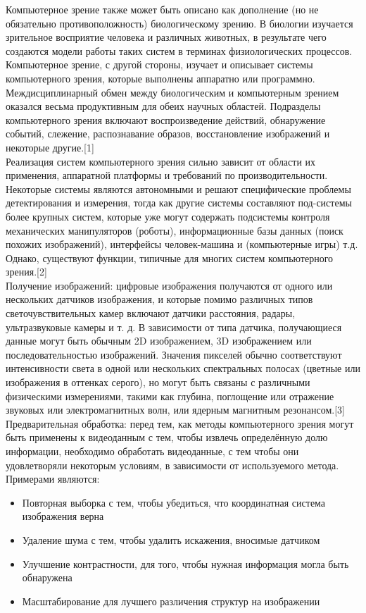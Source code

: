 \documentclass[12pt]{article}
\begin{document}
Компьютерное зрение также может быть описано как дополнение (но не обязательно противоположность) биологическому зрению. В биологии изучается зрительное восприятие человека и различных животных, в результате чего создаются модели работы таких систем в терминах физиологических процессов. Компьютерное зрение, с другой стороны, изучает и описывает системы компьютерного зрения, которые выполнены аппаратно или программно. Междисциплинарный обмен между биологическим и компьютерным зрением оказался весьма продуктивным для обеих научных областей.
Подразделы компьютерного зрения включают воспроизведение действий, обнаружение событий, слежение, распознавание образов, восстановление изображений и некоторые другие.[1]
\\  \indent Реализация систем компьютерного зрения сильно зависит от области их применения, аппаратной платформы и требований по производительности. Некоторые системы являются автономными и решают специфические проблемы детектирования и измерения, тогда как другие системы составляют под-системы более крупных систем, которые уже могут содержать подсистемы контроля механических манипуляторов (роботы), информационные базы данных (поиск похожих изображений), интерфейсы человек-машина и (компьютерные игры) т.д. Однако, существуют функции, типичные для многих систем компьютерного зрения.[2]
\\  \indent  Получение изображений: цифровые изображения получаются от одного или нескольких датчиков изображения, и которые помимо различных типов светочувствительных камер включают датчики расстояния, радары, ультразвуковые камеры и т. д. В зависимости от типа датчика, получающиеся данные могут быть обычным 2D изображением, 3D изображением или последовательностью изображений. Значения пикселей обычно соответствуют интенсивности света в одной или нескольких спектральных полосах (цветные или изображения в оттенках серого), но могут быть связаны с различными физическими измерениями, такими как глубина, поглощение или отражение звуковых или электромагнитных волн, или ядерным магнитным резонансом.[3]
\\  \indent  Предварительная обработка: перед тем, как методы компьютерного зрения могут быть применены к видеоданным с тем, чтобы извлечь определённую долю информации, необходимо обработать видеоданные, с тем чтобы они удовлетворяли некоторым условиям, в зависимости от используемого метода. Примерами являются:

\begin{itemize}
\item Повторная выборка с тем, чтобы убедиться, что координатная система изображения верна
\item Удаление шума с тем, чтобы удалить искажения, вносимые датчиком
\item Улучшение контрастности, для того, чтобы нужная информация могла быть обнаружена
\item Масштабирование для лучшего различения структур на изображении
\end{itemize}
\end{document}
